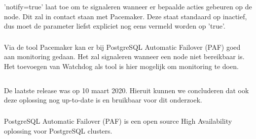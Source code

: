 'notify=true' laat toe om te signaleren wanneer er bepaalde acties gebeuren op de node. Dit zal in contact staan met Pacemaker. Deze staat standaard op inactief, dus moet de parameter liefst expliciet nog eens vermeld worden op 'true'.

\subsubsection{}
\label{subsubsec:Monitoring}

Via de tool Pacemaker kan er bij PostgreSQL Automatic Failover (PAF) goed aan monitoring gedaan. Het zal signaleren wanneer een node niet bereikbaar is.
Het toevoegen van Watchdog als tool is hier mogelijk om monitoring te doen.


\subsection{}
\label{subsec:Should have}




\subsubsection{}
\label{subsubsec:Actieve ondersteuning in 2020-2021}

De laatste release was op 10 maart 2020. Hieruit kunnen we concluderen dat ook deze oplossing nog up-to-date is en bruikbaar voor dit onderzoek. 

\subsubsection{}
\label{subsubsec:Open source}

PostgreSQL Automatic Failover (PAF) is een open source High Availability oplossing voor PostgreSQL clusters.

\subsection{}
\label{subsec:Could have}



